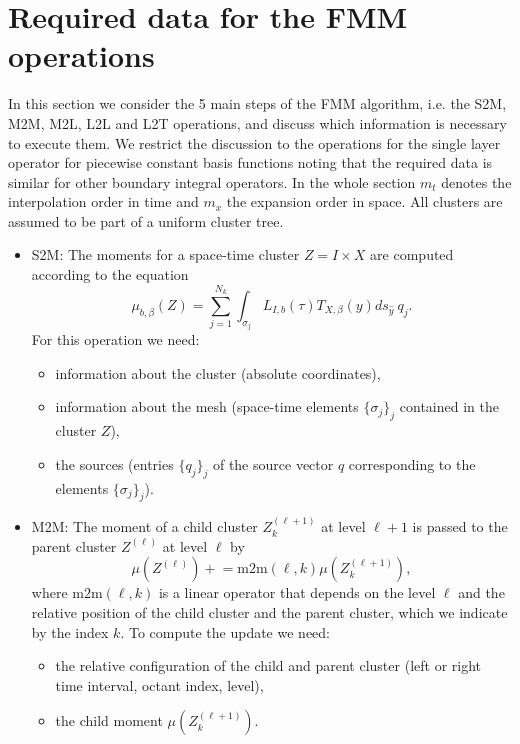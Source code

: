 \documentclass[a4paper,11pt]{article}
\theoremstyle{plain}
\theoremstyle{definition}
\theoremstyle{remark}
\newcommand{\pluseq}{\mathrel{+}=}
\begin{document}
\section{Required data for the FMM operations}
In this section we consider the 5 main steps of the FMM algorithm, i.e. the S2M, M2M, M2L, L2L and L2T operations, and
discuss which information is necessary to execute them. We restrict the discussion to the operations for the single
layer operator for piecewise constant basis functions noting that the required data is similar for other boundary 
integral operators. In the whole section $m_t$ denotes the interpolation order in time and $m_x$ the expansion order in 
space. All clusters are assumed to be part of a uniform cluster tree.
\begin{itemize}
  \item S2M: The moments for a space-time cluster $Z = I \times X$ are computed according to the equation 
    \begin{equation*}
      \mu_{b,\beta}(Z) = \sum_{j=1}^{N_k} \int_{\sigma_j} L_{I,b}(\tau) T_{X,\beta}(y) ds_{\hat{y}}\ q_j.
    \end{equation*}
    For this operation we need:
    \begin{itemize}
      \item information about the cluster (absolute coordinates),
      \item information about the mesh (space-time elements $\{\sigma_j\}_j$ contained in the cluster $Z$),
      \item the sources (entries $\{q_j\}_j$ of the source vector $q$ corresponding to the elements $\{\sigma_j\}_j$).
    \end{itemize}
  \item M2M: The moment of a child cluster $Z_{k}^{(\ell+1)}$ at level $\ell+1$ is passed to the parent cluster 
    $Z^{(\ell)}$ at level $\ell$ by
    \begin{equation*}
      \mu(Z^{(\ell)}) \pluseq \mathrm{m2m}(\ell, k) \mu(Z_{k}^{(\ell+1)}),
    \end{equation*}
    where $\mathrm{m2m}(\ell, k)$ is a linear operator that depends on the level $\ell$ and the relative position of
    the child cluster and the parent cluster, which we indicate by the index $k$. To compute the update we need:
    \begin{itemize}
      \item the relative configuration of the child and parent cluster (left or right time interval, octant index, 
      level),
      \item the child moment $\mu(Z_{k}^{(\ell+1)})$.

\end{itemize}
\end{itemize}
\end{document}
